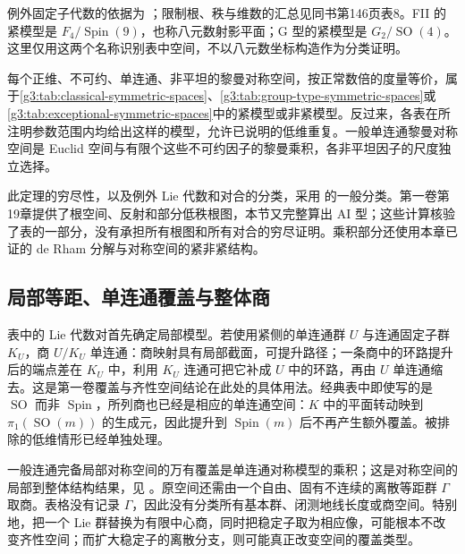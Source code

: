 例外固定子代数的依据为 \cite[第VII章第3节，第124页表5、第130--132页及表6]{Loos1969SymmetricII}；限制根、秩与维数的汇总见同书第146页表8。FII 的紧模型是 \(F_4/\operatorname{Spin}(9)\)，也称八元数射影平面；G 型的紧模型是 \(G_2/\operatorname{SO}(4)\)。这里仅用这两个名称识别表中空间，不以八元数坐标构造作为分类证明。

\begin{theorem}[Cartan 分类]\label{g3:thm:cartan-symmetric-classification}
	每个正维、不可约、单连通、非平坦的黎曼对称空间，按正常数倍的度量等价，属于\ref{g3:tab:classical-symmetric-spaces}、\ref{g3:tab:group-type-symmetric-spaces}或\ref{g3:tab:exceptional-symmetric-spaces}中的紧模型或非紧模型。反过来，各表在所注明参数范围内均给出这样的模型，允许已说明的低维重复。一般单连通黎曼对称空间是 Euclid 空间与有限个这些不可约因子的黎曼乘积，各非平坦因子的尺度独立选择。
\end{theorem}

此定理的穷尽性，以及例外 Lie 代数和对合的分类，采用 \cite[第V章第4节、第VII章第1--3节]{Loos1969SymmetricII} 的一般分类。第一卷第19章提供了根空间、反射和部分低秩根图，本节又完整算出 AI 型；这些计算核验了表的一部分，没有承担所有根图和所有对合的穷尽证明。乘积部分还使用本章已证的 de Rham 分解与对称空间的紧非紧结构。

\subsection{局部等距、单连通覆盖与整体商}
\label{g3:subsec:0506:05}

表中的 Lie 代数对首先确定局部模型。若使用紧侧的单连通群 \(U\) 与连通固定子群 \(K_U\)，商 \(U/K_U\) 单连通：商映射具有局部截面，可提升路径；一条商中的环路提升后的端点差在 \(K_U\) 中，利用 \(K_U\) 连通可把它补成 \(U\) 中的环路，再由 \(U\) 单连通缩去。这是第一卷覆盖与齐性空间结论在此处的具体用法。经典表中即使写的是 \(\operatorname{SO}\) 而非 \(\operatorname{Spin}\)，所列商也已经是相应的单连通空间：\(K\) 中的平面转动映到 \(\pi_1(\operatorname{SO}(m))\) 的生成元，因此提升到 \(\operatorname{Spin}(m)\) 后不再产生额外覆盖。被排除的低维情形已经单独处理。

\ProseParagraphBreak

一般连通完备局部对称空间的万有覆盖是单连通对称模型的乘积；这是对称空间的局部到整体结构结果，见 \cite[第II章第3节、第IV章第1节]{Loos1969SymmetricI}。原空间还需由一个自由、固有不连续的离散等距群 \(\Gamma\) 取商。表格没有记录 \(\Gamma\)，因此没有分类所有基本群、闭测地线长度或商空间。特别地，把一个 Lie 群替换为有限中心商，同时把稳定子取为相应像，可能根本不改变齐性空间；而扩大稳定子的离散分支，则可能真正改变空间的覆盖类型。

